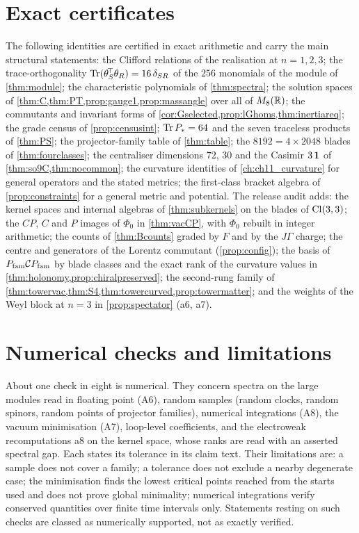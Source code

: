 \section{Exact certificates}
\label{app:repro:cert}

The following identities are certified in exact arithmetic and carry the main structural statements: the Clifford relations of the
realisation at $n=1,2,3$; the trace-orthogonality $\operatorname{Tr}(\theta_S^{\!\top}\theta_R)=16\,\delta_{SR}$ of the $256$ monomials of the module of
\cref{thm:module}; the characteristic polynomials of \cref{thm:spectra}; the solution spaces of \cref{thm:C,thm:PT,prop:gauge1,prop:massangle}
over all of $M_8(\mathbb{R})$; the commutants and invariant forms of \cref{cor:Gselected,prop:lGhoms,thm:inertiareq}; the grade census of
\cref{prop:censusint}; $\operatorname{Tr} P_*=64$ and the seven traceless products of \cref{thm:PS}; the projector-family table of \cref{thm:table}; the
$8192=4\times2048$ blades of \cref{thm:fourclasses}; the centraliser dimensions $72$, $30$ and the Casimir $3\,\mathbf 1$ of
\cref{thm:so9C,thm:nocommon}; the curvature identities of \cref{ch:ch11_curvature} for general operators and the stated metrics; the
first-class bracket algebra of \cref{prop:constraints} for a general metric and potential. The release audit adds: the kernel spaces and
internal algebras of \cref{thm:subkernels} on the blades of $\mathrm{Cl}(3,3)$; the $CP$, $C$ and $P$ images of $\Phi_0$ in \cref{thm:vacCP}, with $\Phi_0$
rebuilt in integer arithmetic; the counts of \cref{thm:Bcounts} graded by $F$ and by the $J\Gamma$ charge; the centre and generators of the Lorentz
commutant (\cref{prop:config}); the basis of $P_{\rm fam}\mathcal CP_{\rm fam}$ by blade classes and the exact rank of the curvature values in
\cref{thm:holonomy,prop:chiralpreserved}; the second-rung family of \cref{thm:towervac,thm:S4,thm:towercurved,prop:towermatter}; and the
weights of the Weyl block at $n=3$ in \cref{prop:spectator} (a6, a7).

\section{Numerical checks and limitations}
\label{app:repro:num}

About one check in eight is numerical. They concern spectra on the large modules read in floating point (A6), random samples (random
clocks, random spinors, random points of projector families), numerical integrations (A8), the vacuum minimisation (A7), loop-level
coefficients, and the electroweak recomputations a8 on the kernel space, whose ranks are read with an asserted spectral gap. Each states its tolerance in its claim text. Their limitations are: a sample does not cover a family; a tolerance does not
exclude a nearby degenerate case; the minimisation finds the lowest critical points reached from the starts used and does not prove
global minimality; numerical integrations verify conserved quantities over finite time intervals only. Statements resting on such checks are
classed as numerically supported, not as exactly verified.


